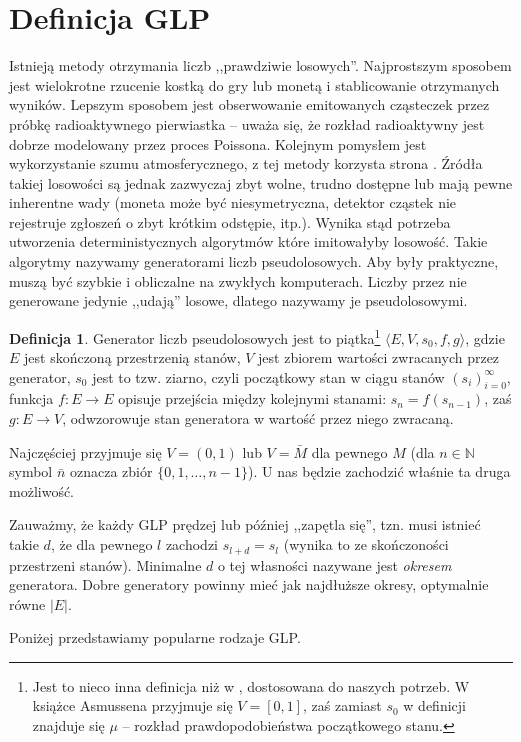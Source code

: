 \documentclass[a4paper,11pt,twoside]{book}
\theoremstyle{definition}
\newtheorem{mydef}{Definicja}[chapter]
\begin{document}
\section{Definicja GLP}
Istnieją metody otrzymania liczb ,,prawdziwie losowych''. Najprostszym sposobem jest wielokrotne rzucenie kostką do gry lub monetą i stablicowanie otrzymanych wyników. Lepszym sposobem jest obserwowanie emitowanych cząsteczek przez próbkę radioaktywnego pierwiastka -- uważa się, że rozkład radioaktywny jest dobrze modelowany przez proces Poissona. Kolejnym pomysłem jest wykorzystanie szumu atmosferycznego, z tej metody korzysta strona \cite{rorg}. Źródła takiej losowości są jednak zazwyczaj zbyt wolne, trudno dostępne lub mają pewne inherentne wady (moneta może być niesymetryczna, detektor cząstek nie rejestruje zgłoszeń o zbyt krótkim odstępie, itp.). Wynika stąd potrzeba utworzenia deterministycznych algorytmów które imitowałyby losowość. Takie algorytmy nazywamy generatorami liczb pseudolosowych. Aby były praktyczne, muszą być szybkie i obliczalne na zwykłych komputerach. Liczby przez nie generowane jedynie ,,udają'' losowe, dlatego nazywamy je pseudolosowymi.
\begin{mydef}
\label{def:glp}
 Generator liczb pseudolosowych jest to piątka\footnote{Jest to nieco inna definicja niż w \cite{asmussen}, dostosowana do naszych potrzeb. W książce Asmussena przyjmuje się $V = [0,1]$, zaś zamiast $s_0$ w definicji znajduje się $\mu$ -- rozkład prawdopodobieństwa początkowego stanu.} $\langle E, V, s_0, f, g \rangle$, gdzie $E$ jest skończoną przestrzenią stanów, $V$ jest zbiorem wartości zwracanych przez generator, $s_0$ jest to tzw. ziarno, czyli początkowy stan w ciągu stanów $(s_i)_{i=0}^\infty$, funkcja $f:E \rightarrow E$ opisuje przejścia między kolejnymi stanami: $s_n = f(s_{n-1})$, zaś $g:E\rightarrow V$, odwzorowuje stan generatora w wartość przez niego zwracaną.
\end{mydef}
Najczęściej przyjmuje się $V = (0,1)$ lub $V = \bar{M}$ dla pewnego $M$ (dla $n \in \mathbb{N}$ symbol $\bar{n}$ oznacza zbiór $\{0,1,\ldots,n-1\}$). U nas będzie zachodzić właśnie ta druga możliwość.

Zauważmy, że każdy GLP prędzej lub później ,,zapętla się'', tzn. musi istnieć takie $d$, że dla pewnego $l$ zachodzi $s_{l+d} = s_l$ (wynika to ze skończoności przestrzeni stanów). Minimalne $d$ o tej własności nazywane jest \textit{okresem} generatora. Dobre generatory powinny mieć jak najdłuższe okresy, optymalnie równe $|E|$.

Poniżej przedstawiamy popularne rodzaje GLP.
\end{document}
